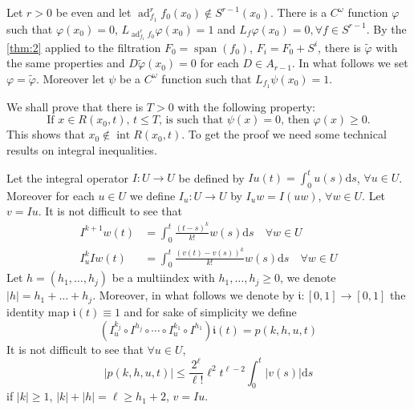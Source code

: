 \documentclass{article}
\newcommand{\interior}{\operatorname{int}}
\newcommand{\dd}{\mathrm{d}}
\begin{document}
Let $r>0$ be even and let $\operatorname{ad}_{f_1}^r f_0\left(x_0\right) \notin S^{r-1}\left(x_0\right)$. 
There is a $C^\omega$ function $\varphi$ such that $\varphi\left(x_0\right)=0$, $L_{\operatorname{ad}_{f_1}^r f_0} \varphi\left(x_0\right)=1$ and $L_f \varphi\left(x_0\right)=0, \forall f \in S^{r-1}$. 
By the \cref{thm:2} applied to the filtration $F_0=\operatorname{span}\left(f_0\right)$, $F_{i}=F_0+S^i$, there is $\tilde{\varphi}$ with the same properties and $D \tilde{\varphi}\left(x_0\right)=0$ for each $D \in A_{r-1}$. 
In what follows we set $\varphi=\tilde{\varphi}$.
Moreover let $\psi$ be a $C^\omega$ function such that $L_{f_1} \psi\left(x_0\right)=1$.

We shall prove that there is $T>0$ with the following property:
\begin{equation}
	\tag{P}
	\label{eq:P}
	\text{If $x \in R\left(x_0, t\right)$, $t \leq T$, is such that $\psi(x)=0$, then $\varphi(x) \geq 0$.}
\end{equation}
This shows that $x_0 \notin \interior R\left(x_0, t\right)$. 
To get the proof we need some technical results on integral inequalities.

Let the integral operator $I: U\to U$ be defined by $I u(t)=\int_0^t u(s) \dd s$, $\forall u \in U$.
Moreover for each $u \in U$ we define $I_u : U \to U$ by $I_u w = I(u w)$, $\forall w \in U$.
Let $v=I u$. It is not difficult to see that
\begin{align}
	\label{eq:6}
	I^{k+1} w(t) & = \int_0^t \frac{(t-s)^k}{k !} w(s) \dd s \quad \forall w \in U \\
	\label{eq:7}
	I_u^k I w(t) & = \int_0^t \frac{(v(t)-v(s))^k}{k !} w(s) \dd s \quad \forall w \in U
\end{align}
Let $h=\left(h_1, \ldots, h_j\right)$ be a multiindex with $h_1, \ldots, h_j \geq 0$, we denote $|h|=h_1+\ldots+h_j$. Moreover, in what follows we denote by $\mathfrak{i}: [0,1] \to [0,1]$ the identity map $\mathfrak{i}(t) \equiv 1$ and for sake of simplicity we define
\begin{equation}
	\label{eq:8}
	\left(I_u^{k_j} \circ I^{h_j} \circ \cdots \circ I_u^{k_1} \circ I^{h_1}\right) \mathfrak{i}(t)=p(k, h, u, t)
\end{equation}
It is not difficult to see that $\forall u \in U$,
\begin{equation}
	\label{eq:9}
	|p(k, h, u, t)| \leq \frac{2^{\ell}}{\ell !} \ell^2 t^{\ell-2} \int_0^t|v(s)| \dd s
\end{equation}
if $|k| \geq 1$, $|k|+|h|=\ell \geq h_1+2$, $v=I u$.
\end{document}
